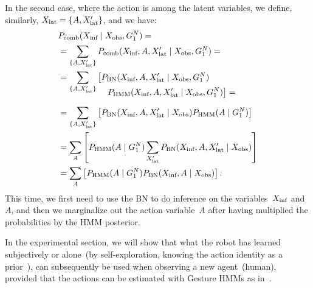 In the second case, where the action is among the latent variables, we define, similarly, $X_\text{lat} = \{A, X_\text{lat}^\prime\}$, and we have:
\begin{align*}
  & \pcomb(\xinf \given \xobs, G_1^N) = \\
  &= \sum_{\{A,\xlat^\prime\}} \pcomb(\xinf, A, \xlat^\prime \given \xobs, G_1^N)=\\
  &= \sum_{\{A,\xlat^\prime\}} \left[\pbn(\xinf, A, \xlat^\prime \given \xobs, G_1^N)\right. \\[-4mm]
    & \mspace{100mu} \left.\phmm(\xinf, A, \xlat^\prime \given \xobs, G_1^N)\right]= \\[2mm]
  &= \sum_{\{A,\xlat^\prime\}} \left[\pbn(\xinf, A, \xlat^\prime \given \xobs) \phmm(A \given G_1^N)\right] \\
  &= \sum_{A}\left[\phmm(A \given G_1^N)\sum_{\xlat^\prime} \pbn(\xinf, A, \xlat^\prime \given \xobs)\right] \\
  &= \sum_{A}\left[\phmm(A \given G_1^N) \pbn(\xinf, A \given \xobs)\right]. \\
\end{align*}
This time, we first need to use the \ac{BN} to do inference on the variables~$X_\text{inf}$ and~$A$, and then we marginalize out the action variable~$A$ after having multiplied the probabilities by the \ac{HMM} posterior.

%
%
%
%
In the experimental section, we will show that what the robot has learned subjectively or alone~(by self-exploration, knowing the action identity as a prior~\cite{salvi:2012:smcb}), can subsequently be used when observing a new agent~(human), provided that the actions can be estimated with Gesture \acp{HMM} as in~\cite{saponaro:2013:crhri}.
